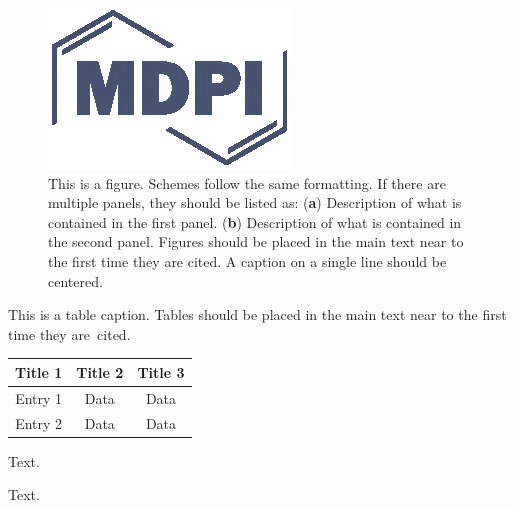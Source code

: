 \begin{paracol}{2}
\begin{figure}[H]
\includegraphics[width=10.5 cm]{Definitions/logo-mdpi}
\caption{This is a figure. Schemes follow the same formatting. If there are multiple panels, they should be listed as: (\textbf{a}) Description of what is contained in the first panel. (\textbf{b}) Description of what is contained in the second panel. Figures should be placed in the main text near to the first time they are cited. A caption on a single line should be centered.\label{fig1}}
\end{figure}   

\begin{specialtable}[H] 
\caption{This is a table caption. Tables should be placed in the main text near to the first time they are~cited.\label{tab1}}
\begin{tabular}{ccc}
\toprule
\textbf{Title 1}	& \textbf{Title 2}	& \textbf{Title 3}\\
\midrule
Entry 1		& Data			& Data\\
Entry 2		& Data			& Data\\
\bottomrule
\end{tabular}
\end{specialtable}


Text.

Text.


\end{paracol}
